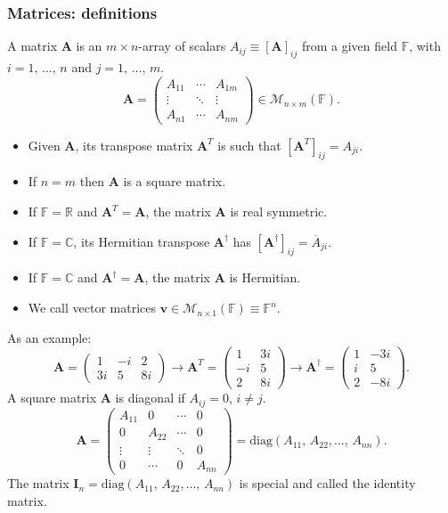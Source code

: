 \documentclass{article}
\begin{document}
\subsubsection{Matrices: definitions}
A matrix $\mathbf{A}$ is an $m\times n$-array of scalars $A_{ij}\equiv \left[ \mathbf{A} \right]_{ij}$ from a given field $\mathbb{F}$, with $i=1,\,\ldots,\,n$ and $j=1,\,\ldots,\,m$.
\begin{equation}
\mathbf{A} = \begin{pmatrix} A_{11} & \cdots & A_{1m} \\
\vdots & \ddots & \vdots \\
A_{n1} & \cdots & A_{nm}\end{pmatrix} \in \mathcal{M}_{n\times m}(\mathbb{F}).
\end{equation}
\begin{itemize}
    \item Given $\mathbf{A}$, its transpose matrix $\mathbf{A}^T$ is such that $[\mathbf{A}^T]_{ij}=A_{ji}$.
    \item If $n=m$ then $\mathbf{A}$ is a square matrix.
    \item If $\mathbb{F}=\mathbb{R}$ and $\mathbf{A}^T = \mathbf{A}$, the matrix $\mathbf{A}$ is real symmetric.
    \item If $\mathbb{F}=\mathbb{C}$, its Hermitian transpose $\mathbf{A}^\dagger$ has $[\mathbf{A}^\dagger]_{ij} = \overline{A}_{ji}$.
    \item If $\mathbb{F}=\mathbb{C}$ and $\mathbf{A}^\dagger = \mathbf{A}$, the matrix $\mathbf{A}$ is Hermitian.
    \item We call vector matrices $\mathbf{v}\in\mathcal{M}_{n\times1}(\mathbb{F})\equiv \mathbb{F}^n$.
\end{itemize}
As an example:
\begin{equation}
    \mathbf{A} = \begin{pmatrix} 1 & -i & 2 \\ 3i & 5 & 8i \end{pmatrix} \to \mathbf{A}^T=\begin{pmatrix} 1 & 3i \\ -i & 5 \\ 2 & 8i \end{pmatrix} \to \mathbf{A}^\dagger=\begin{pmatrix} 1 & -3i \\ i & 5 \\ 2 & -8i \end{pmatrix}. 
\end{equation}
A square matrix $\mathbf{A}$ is diagonal if $A_{ij}=0$, $i\neq j$.
\begin{equation}
    \mathbf{A} = \begin{pmatrix} A_{11} & 0 & \cdots & 0 \\ 0 & A_{22} & \cdots & 0 \\ \vdots & \vdots & \ddots & 0 \\ 0 & \cdots & 0 & A_{nn} \end{pmatrix} = \text{diag}(A_{11},\,A_{22},\ldots,\,A_{nn}).
\end{equation}
The matrix $\mathbf{I}_n = \text{diag}(A_{11},\,A_{22},\ldots,\,A_{nn})$ is special and called the identity matrix.
\end{document}
